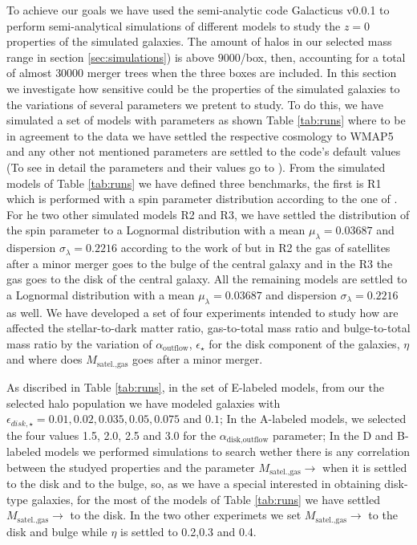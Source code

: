 \documentclass[usenatbib]{mn2e}
\begin{document}
To achieve our goals we have used the semi-analytic code Galacticus v0.0.1 to perform semi-analytical simulations of different models to study the $z=0$  
properties of the simulated galaxies. The amount of halos in our selected mass range in section \ref{sec:simulations}) is above $9000$/box, then, accounting 
for a total of almost $30000$ merger trees when the three boxes are included. In this section we investigate  how sensitive could be the properties of the 
simulated  galaxies  to the variations of several parameters we pretent to study. To do this, we have simulated a set of models with parameters as shown Table 
\ref{tab:runs} where to be in agreement to the data we have settled the respective cosmology to WMAP5 and any other not mentioned parameters are settled to the
 code's default values (To see in detail the parameters and their values go to \cite{2010arXiv1008.1786B}). From the  simulated models of Table \ref{tab:runs}
 we have defined three benchmarks,  the first is R1 which is performed with a spin parameter distribution according to the one of \cite{2007MNRAS.376..215B}.
 For he two other simulated models R2 and R3,  we have settled the distribution of the spin parameter to a Lognormal distribution  with a mean 
 $\mu_{\lambda}=0.03687$ and dispersion $\sigma_{\lambda}=0.2216$ according to the work of \cite{2011MNRAS.411..584M} but in  R2 the gas of satellites after 
a minor merger goes to the bulge of the central galaxy and in the R3 the gas goes to the disk of the central galaxy. All the remaining models are settled to a
 Lognormal distribution with a mean $\mu_{\lambda}=0.03687$ and dispersion $\sigma_{\lambda}=0.2216$ as well. We have developed a set of four experiments 
intended to study how are affected the stellar-to-dark matter ratio, gas-to-total mass ratio and bulge-to-total mass ratio by the variation of  
$\alpha_{\text{outflow}}$, $\epsilon_\star$ for the disk component of the galaxies, $\eta$ and where does $M_{\text{satel.,gas}}$ goes after a minor merger.

As discribed in Table \ref{tab:runs}, in the set of E-labeled models, from our the selected halo population we have modeled galaxies  with 
$\epsilon_{disk,\star}=0.01, 0.02, 0.035, 0.05,0.075$ and $0.1$; In the A-labeled models, we selected the four values 1.5, 2.0, 2.5 and 3.0 for the 
$\alpha_{\text{disk,outflow}}$ parameter; In the D and B-labeled models we performed simulations to search wether there is any 
correlation between the studyed properties and the parameter $M_{\text{satel.,gas}}\to$ when it is settled to the disk and to the bulge, so, as we have a special
 interested in obtaining disk-type galaxies, for the most of the models  of Table \ref{tab:runs} we have settled $M_{\text{satel.,gas}}\to$ to the disk. In the
 two other experimets we set $M_{\text{satel.,gas}}\to$ to the disk and bulge while $\eta$ is settled to 0.2,0.3 and 0.4.
\end{document}
